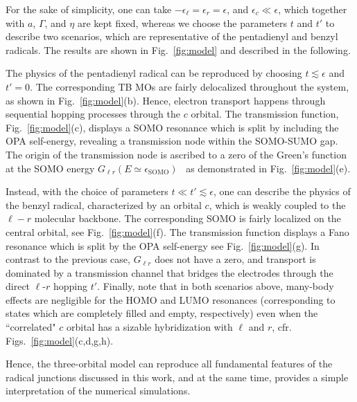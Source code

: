 \documentclass[aps,prx,twocolumn,superscriptaddress]{revtex4-2}
\begin{document}
For the sake of simplicity, one can take $-\epsilon_\ell = \epsilon_r = \epsilon$, and $\epsilon_c \ll \epsilon$, 
which together with $a$, $\Gamma$, and $\eta$ are kept fixed, 
whereas we choose the parameters $t$ and $t'$ to describe two scenarios, 
which are representative of the pentadienyl and benzyl radicals. 
The results are shown in Fig.~\ref{fig:model} and described in the following. 

The physics of the pentadienyl radical can be reproduced by choosing $t\lesssim\epsilon$ and $t'=0$. 
The corresponding TB MOs are fairly delocalized throughout the system, as shown in Fig.~\ref{fig:model}(b).  
Hence, electron transport happens through sequential hopping processes through the $c$ orbital. 
The transmission function, Fig.~\ref{fig:model}(c), displays a SOMO resonance which is split by including the OPA self-energy,  
revealing a transmission node within the SOMO-SUMO gap. 
The origin of the transmission node is ascribed to a zero of the Green's function at the SOMO energy 
$G_{\ell r}(E\simeq\epsilon_\mathrm{SOMO})$~\cite{valliNL18,valliPRB100} 
as demonstrated in Fig.~\ref{fig:model}(e). 

Instead, with the choice of parameters $t \ll t' \lesssim \epsilon$, one can describe the physics of the benzyl radical, 
characterized by an orbital $c$, which is weakly coupled to the $\ell-r$ molecular backbone. 
The corresponding SOMO is fairly localized on the central orbital, see Fig.~\ref{fig:model}(f). 
The transmission function displays a Fano resonance which is split by the OPA self-energy
see Fig.~\ref{fig:model}(g).  
In contrast to the previous case, $G_{\ell r}$ does not have a zero, 
and transport is dominated by a transmission channel that bridges the electrodes through the direct $\ell$-$r$ hopping $t'$. 
Finally, note that in both scenarios above, many-body effects are negligible for the HOMO and LUMO resonances 
(corresponding to states which are completely filled and empty, respectively)
even when the ``correlated" $c$ orbital has a sizable hybridization with $\ell$ and $r$, 
cfr. Figs.~\ref{fig:model}(c,d,g,h). 

Hence, the three-orbital model can reproduce all fundamental features 
of the radical junctions discussed in this work, 
and at the same time, provides a simple interpretation of the numerical simulations. 
\end{document}
